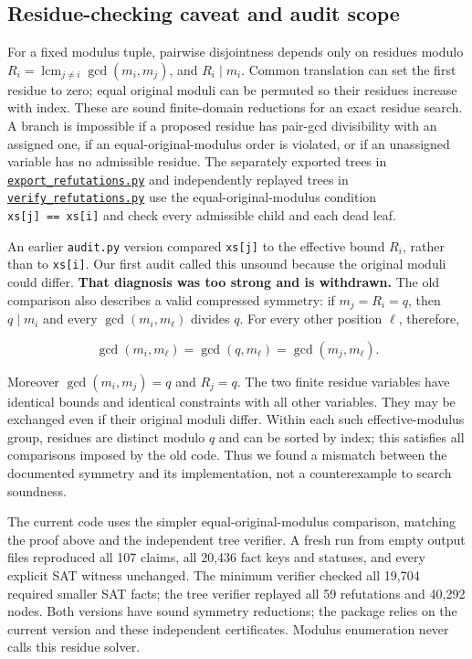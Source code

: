\documentclass[11pt,a4paper]{article}
\begin{document}
\subsection{Residue-checking caveat and audit scope}\label{residue-checking-caveat-and-audit-scope}

For a fixed modulus tuple, pairwise disjointness depends only on residues modulo \(R_i=\operatorname{lcm}_{j\ne i}\gcd(m_i,m_j)\), and \(R_i\mid m_i\). Common translation can set the first residue to zero; equal original moduli can be permuted so their residues increase with index. These are sound finite-domain reductions for an exact residue search. A branch is impossible if a proposed residue has pair-gcd divisibility with an assigned one, if an equal-original-modulus order is violated, or if an unassigned variable has no admissible residue. The separately exported trees in \href{https://github.com/mpelteshki/climbing-to-the-frontier/blob/ed55f76eb8c558825bb629fd2cd8dbf46e5f1314/cagent/p4/audit/export_refutations.py}{\texttt{export\_refutations.py}} and independently replayed trees in \href{https://github.com/mpelteshki/climbing-to-the-frontier/blob/ed55f76eb8c558825bb629fd2cd8dbf46e5f1314/cagent/p4/audit/verify_refutations.py}{\texttt{verify\_refutations.py}} use the equal-original-modulus condition \texttt{xs{[}j{]}\ ==\ xs{[}i{]}} and check every admissible child and each dead leaf.

An earlier \texttt{audit.py} version compared \texttt{xs{[}j{]}} to the effective bound \(R_i\), rather than to \texttt{xs{[}i{]}}. Our first audit called this unsound because the original moduli could differ. \textbf{That diagnosis was too strong and is withdrawn.} The old comparison also describes a valid compressed symmetry: if \(m_j=R_i=q\), then \(q\mid m_i\) and every \(\gcd(m_i,m_\ell)\) divides \(q\). For every other position \(\ell\), therefore,

\[\gcd(m_i,m_\ell)=\gcd(q,m_\ell)=\gcd(m_j,m_\ell).\]

Moreover \(\gcd(m_i,m_j)=q\) and \(R_j=q\). The two finite residue variables have identical bounds and identical constraints with all other variables. They may be exchanged even if their original moduli differ. Within each such effective-modulus group, residues are distinct modulo \(q\) and can be sorted by index; this satisfies all comparisons imposed by the old code. Thus we found a mismatch between the documented symmetry and its implementation, not a counterexample to search soundness.

The current code uses the simpler equal-original-modulus comparison, matching the proof above and the independent tree verifier. A fresh run from empty output files reproduced all 107 claims, all 20,436 fact keys and statuses, and every explicit SAT witness unchanged. The minimum verifier checked all 19,704 required smaller SAT facts; the tree verifier replayed all 59 refutations and 40,292 nodes. Both versions have sound symmetry reductions; the package relies on the current version and these independent certificates. Modulus enumeration never calls this residue solver.
\end{document}
